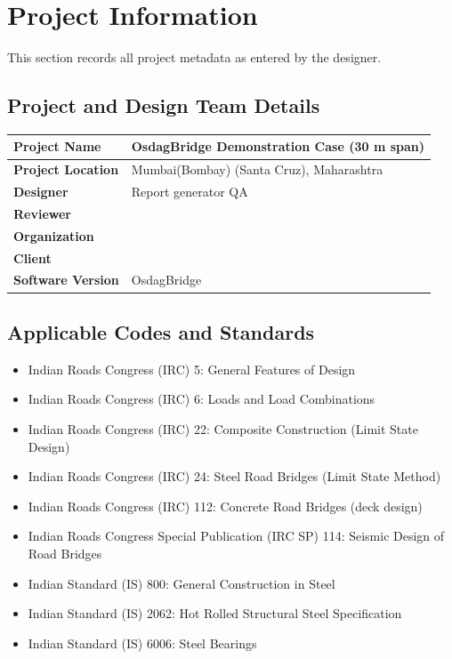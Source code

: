 \documentclass[12pt,a4paper]{report}
\numberwithin{table}{chapter}
\numberwithin{figure}{chapter}
\begin{document}
\titleformat{\chapter}[block]{\normalfont\Large\bfseries\centering}{\thechapter}{1em}{}
\titlespacing*{\chapter}{0pt}{-30pt}{10pt}


\chapter{Project Information}

This section records all project metadata as entered by the designer.

\section{Project and Design Team Details}
\label{sec:project-details}

\begin{tabular}{|L{5.5cm}|L{8.5cm}|}
\hline
\textbf{Project Name} & OsdagBridge Demonstration Case (30 m span) \\
\hline
\textbf{Project Location} & Mumbai(Bombay) (Santa Cruz), Maharashtra \\
\hline
\textbf{Designer} & Report generator QA \\
\hline
\textbf{Reviewer} &  \\
\hline
\textbf{Organization} &  \\
\hline
\textbf{Client} &  \\
\hline
\textbf{Software Version} & OsdagBridge \\
\hline
\end{tabular}


\section{Applicable Codes and Standards}
\label{sec:codes}

\begin{itemize}
\item Indian Roads Congress (IRC) 5: General Features of Design
\item Indian Roads Congress (IRC) 6: Loads and Load Combinations
\item Indian Roads Congress (IRC) 22: Composite Construction (Limit State Design)
\item Indian Roads Congress (IRC) 24: Steel Road Bridges (Limit State Method)
\item Indian Roads Congress (IRC) 112: Concrete Road Bridges (deck design)
\item Indian Roads Congress Special Publication (IRC SP) 114: Seismic Design of Road Bridges
\item Indian Standard (IS) 800: General Construction in Steel
\item Indian Standard (IS) 2062: Hot Rolled Structural Steel Specification
\item Indian Standard (IS) 6006: Steel Bearings
\end{itemize}
\end{document}
